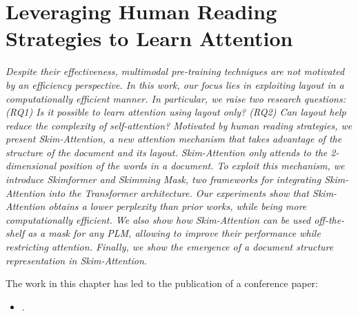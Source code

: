 
\chapter{Leveraging Human Reading Strategies to Learn Attention}
\label{chapter:chapter3}

\renewcommand{\leftmark}{\spacedlowsmallcaps{Leveraging Human Reading Strategies to Learn Attention}}

\begin{chapabstract}
	{\em
            Despite their effectiveness, multimodal pre-training techniques are not motivated by an efficiency perspective. In this work, our focus lies in exploiting layout in a computationally efficient manner. In particular, we raise two research questions: (RQ1) Is it possible to learn attention using layout only? (RQ2) Can layout help reduce the complexity of self-attention? Motivated by human reading strategies, we present Skim-Attention, a new attention mechanism that takes advantage of the structure of the document and its layout. Skim-Attention only attends to the 2-dimensional position of the words in a document. To exploit this mechanism, we introduce Skimformer and Skimming Mask, two frameworks for integrating Skim-Attention into the Transformer architecture. Our experiments show that Skim-Attention obtains a lower perplexity than prior works, while being more computationally efficient. We also show how Skim-Attention can be used off-the-shelf as a mask for any \ac{PLM}, allowing to improve their performance while restricting attention. Finally, we show the emergence of a document structure representation in Skim-Attention.     
	\vspace*{5mm}
	
	The work in this chapter has led to the publication of a conference paper:}
	\begin{itemize}
		\item \small {}.
	\end{itemize}
\end{chapabstract}



\newpage

\minitoc
{}


